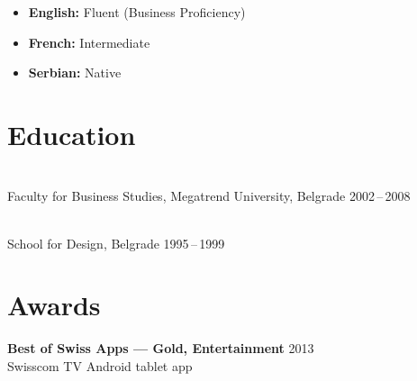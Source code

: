 \documentclass[a4paper,9.5pt]{article}
\begin{document}
\begin{itemize}[leftmargin=1.2em, label={•},
    topsep=0pt, itemsep=2pt, parsep=0pt]
  \item {\small\textbf{English:} Fluent (Business Proficiency)}
  \item {\small\textbf{French:} Intermediate}
  \item {\small\textbf{Serbian:} Native}
\end{itemize}

\section{Education}

\\[1pt]
{\small\color{midgray}Faculty for Business Studies,
Megatrend University, Belgrade \hfill 2002\,--\,2008}

\vspace{6pt}

\\[1pt]
{\small\color{midgray}School for Design, Belgrade
\hfill 1995\,--\,1999}

\section{Awards}

{\small\textbf{Best of Swiss Apps — Gold, Entertainment} \hfill 2013\\
\color{midgray}Swisscom TV Android tablet app}
\end{document}
